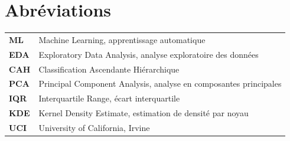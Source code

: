 \documentclass[12pt,oneside]{book}
\begin{document}
\chapter*{Abréviations}
\begin{tabularx}{\textwidth}{>{\bfseries}lX}
ML & Machine Learning, apprentissage automatique\\
EDA & Exploratory Data Analysis, analyse exploratoire des données\\
CAH & Classification Ascendante Hiérarchique\\
PCA & Principal Component Analysis, analyse en composantes principales\\
IQR & Interquartile Range, écart interquartile\\
KDE & Kernel Density Estimate, estimation de densité par noyau\\
UCI & University of California, Irvine\\
\end{tabularx}

\tableofcontents
\listoffigures
\listoftables

\mainmatter













\appendix


\backmatter
\printbibliography[heading=bibintoc,title={Bibliographie}]
\end{document}
